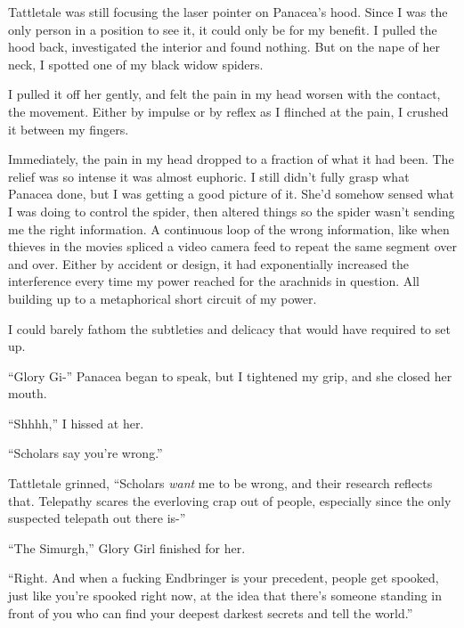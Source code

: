 Tattletale was still focusing the laser pointer on Panacea's hood.  Since I was the only person in a position to see it, it could only be for my benefit.  I pulled the hood back, investigated the interior and found nothing.  But on the nape of her neck, I spotted one of my black widow spiders.



I pulled it off her gently, and felt the pain in my head worsen with the contact, the movement.  Either by impulse or by reflex as I flinched at the pain, I crushed it between my fingers.



Immediately, the pain in my head dropped to a fraction of what it had been.  The relief was so intense it was almost euphoric.  I still didn't fully grasp what Panacea done, but I was getting a good picture of it.  She'd somehow sensed what I was doing to control the spider, then altered things so the spider wasn't sending me the right information.  A continuous loop of the wrong information, like when thieves in the movies spliced a video camera feed to repeat the same segment over and over.  Either by accident or design, it had exponentially increased the interference every time my power reached for the arachnids in question.  All building up to a metaphorical short circuit of my power.



I could barely fathom the subtleties and delicacy that would have required to set up.



``Glory Gi-'' Panacea began to speak, but I tightened my grip, and she closed her mouth.



``Shhhh,'' I hissed at her.



``Scholars say you're wrong.''



Tattletale grinned, ``Scholars \emph{want} me to be wrong, and their research reflects that.  Telepathy scares the everloving crap out of people, especially since the only suspected telepath out there is-''



``The Simurgh,'' Glory Girl finished for her.



``Right.  And when a fucking Endbringer is your precedent, people get spooked, just like you're spooked right now, at the idea that there's someone standing in front of you who can find your deepest darkest secrets and tell the world.''



